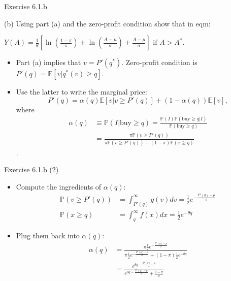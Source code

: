 \documentclass[english,10pt,aspectratio=169]{beamer}
\begin{document}
\begin{frame}{Exercise 6.1.b}
	\begin{exampleblock}{}
		(b) Using part (a) and the zero-profit condition show that in eqm:
		\begin{center}
			$
			Y(A)=\frac{1}{\theta} \left[\ln \left(\frac{1-\pi}{\pi}\right) + \ln \left(\frac{A-\mu}{\sigma}\right) + \frac{A-\mu}{\sigma}\right]\text{ if } A>A^*.
			$
		\end{center}
	\end{exampleblock}

	\pause

	\begin{itemize}
		\item Part (a) implies that $v=P'(q^*)$. Zero-profit condition is $P'(q) = \mathbb{E} [v | q^*(v) \geq q]$.
		
		\item Use the latter to write the marginal price:
		\[
			P'(q) = \alpha(q) \mathbb{E}[v|v \ge P'(q)]+(1-\alpha(q))\mathbb{E}[v],
		\]
		where 
		\begin{align*}
			\alpha(q) &\equiv \mathbb{P}(I|\text{buy} \geq q) = \frac{\mathbb{P}(I)\mathbb{P}(\text{buy} \geq q|I) }{\mathbb{P}(\text{buy} \geq q)} 
			\\
			&= \frac{\pi \mathbb{P}(v \ge P'(q))}{\pi \mathbb{P}(v \ge P'(q))+(1-\pi)\mathbb{P}(x \ge q)}
		\end{align*}.
	\end{itemize}
\end{frame}


\begin{frame}{Exercise 6.1.b (2)}
	\begin{itemize}
		\item Compute the ingredients of $\alpha(q)$:
		\begin{align*}
			\mathbb{P}(v \ge P'(q)) 	&=\int_{P'(q)}^\infty g(v) dv = \frac{1}{2} e^{-\frac{P'(q)-\mu}{\sigma}} \\
			\mathbb{P}(x \ge q)	&=\int_q^\infty f(x) dx = \frac{1}{2}e^{-\theta q}
		\end{align*}
		\item Plug them back into $\alpha(q)$:
		\begin{align*}
			\alpha(q)
			& =\frac{\pi \frac{1}{2} e^{-\frac{P'(q)-\mu}{\sigma}}}{\pi \frac{1}{2} e^{-\frac{P'(q)-\mu}{\sigma}} + (1-\pi)\frac{1}{2}e^{-\theta q}} 
			\\
			& = \frac{e^{\theta q-\frac{P'(q)-\mu}{\sigma}}}{e^{\theta q-\frac{P'(q)-\mu }{\sigma}} + \frac{1-\pi}{\pi}} 
		\end{align*}
	\end{itemize}
\end{frame}
\end{document}

